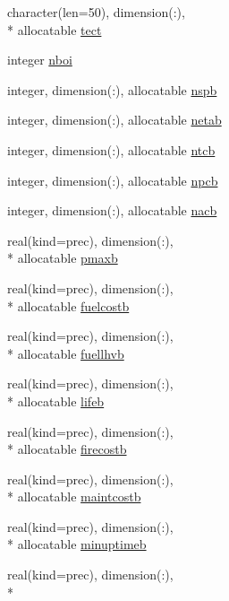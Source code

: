 \begin{DoxyCompactItemize}
\item 
character(len=50), dimension(\-:), \\*
allocatable \hyperlink{classinputvar_afb7d5163d753c7bbd2c1505e8ee68197}{tect}
\item 
integer \hyperlink{classinputvar_a168bc1dcb73e68b3620991b6494f3797}{nboi}
\item 
integer, dimension(\-:), allocatable \hyperlink{classinputvar_aa1e78ecd4b3cbb3f08b770cf604a5d3d}{nspb}
\item 
integer, dimension(\-:), allocatable \hyperlink{classinputvar_af109996c7b379bac5d6c3d89c5b6df1d}{netab}
\item 
integer, dimension(\-:), allocatable \hyperlink{classinputvar_a41aaaf97cb1f1e815c73bcfa5f975be3}{ntcb}
\item 
integer, dimension(\-:), allocatable \hyperlink{classinputvar_a4f83c89634ccb8f94fca08a023648791}{npcb}
\item 
integer, dimension(\-:), allocatable \hyperlink{classinputvar_ae517f545e388b4352b7941203efa8449}{nacb}
\item 
real(kind=prec), dimension(\-:), \\*
allocatable \hyperlink{classinputvar_a29e37a8460969d1438ed9aeb5d37d798}{pmaxb}
\item 
real(kind=prec), dimension(\-:), \\*
allocatable \hyperlink{classinputvar_a7ba5eba73efe4e693920d6af7782e58e}{fuelcostb}
\item 
real(kind=prec), dimension(\-:), \\*
allocatable \hyperlink{classinputvar_a3cd62c9288fded8bd8de8066cbb3ca20}{fuellhvb}
\item 
real(kind=prec), dimension(\-:), \\*
allocatable \hyperlink{classinputvar_a74dcd10e62524e2f5145df13548eae82}{lifeb}
\item 
real(kind=prec), dimension(\-:), \\*
allocatable \hyperlink{classinputvar_a1560f8312d0c0606566ee8f7e21c1e49}{firecostb}
\item 
real(kind=prec), dimension(\-:), \\*
allocatable \hyperlink{classinputvar_ac52f743f02f10e96c455d94c3cdc0fe8}{maintcostb}
\item 
real(kind=prec), dimension(\-:), \\*
allocatable \hyperlink{classinputvar_a699644b9b98282661cd55dc10d96dbcb}{minuptimeb}
\item 
real(kind=prec), dimension(\-:), \\*

\end{DoxyCompactItemize}
